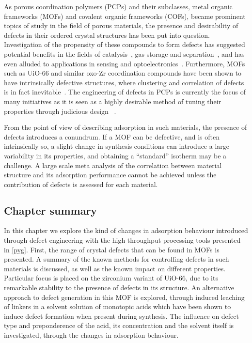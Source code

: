 As porous coordination polymers (PCPs) and their subclasses,
metal organic frameworks (MOFs) and covalent organic frameworks (COFs),
became prominent topics of study in the field of porous materials,
the presence and desirability of defects in their ordered crystal
structures has been put into question. Investigation of the 
propensity of these compounds to form defects has suggested 
potential benefits in the fields of 
catalysis~\cite{shollDefectsMetalOrganic2015}, gas storage
and separation~\cite{%
    choiRoleStructuralDefects2018,%
    ghoshWaterAdsorptionUiO662014,%
    liSelectiveGasAdsorption2009%
}, and has even alluded to applications in
sensing and optoelectronics~\cite{cliffeMetalOrganicNanosheets2017}.
Furthermore, MOFs
such as UiO-66 and similar oxo-Zr coordination compounds have been 
shown to have intrinsically defective structures, where clustering 
and correlation of defects is in fact 
inevitable~\cite{cliffeCorrelatedDefectNanoregions2014}.
The engineering of defects in PCPs is currently the focus of many
initiatives as it is seen as a highly desirable method of tuning 
their properties through judicious design
~\cite{
    shollDefectsMetalOrganic2015,%
    bennettInterplayDefectsDisorder2016,%
    liangLinkingDefectsHierarchical2018%
}.

From the point of view of describing adsorption in 
such materials, the presence of defects introduces a conundrum.
If a MOF can be defective, and is often intrinsically so,
a slight change in synthesis conditions can introduce a 
large variability in its properties, and obtaining a 
``standard'' isotherm may be a challenge. A large scale
meta analysis of the correlation between material structure
and its adsorption performance cannot be achieved unless
the contribution of defects is assessed for each material.

\subsection*{Chapter summary}

In this chapter we explore the kind of changes in 
adsorption behaviour introduced through defect engineering with 
the high throughput processing tools presented in \autoref{pyg}.
First, the range of crystal defects that can be found in MOFs 
is presented. A summary of the known methods for controlling defects in
such materials is discussed, as well as the known impact on 
different properties.
Particular focus is placed on the zirconium variant of UiO-66,
due to its remarkable stability to the presence of defects in its
structure.
An alternative approach to defect generation in this MOF is explored,
through induced leaching of linkers in a solvent solution of monotopic
acids which have been shown to induce defect formation when present
during synthesis. The influence on defect type and preponderence 
of the acid, its concentration and 
the solvent itself is investigated, through the changes in 
adsorption behaviour.

